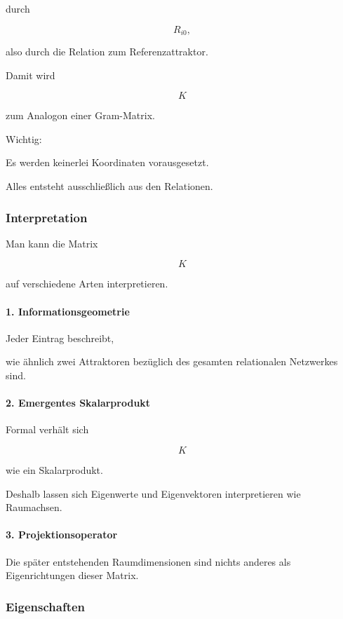 durch

\[
R_{i0},
\]

also durch die Relation zum Referenzattraktor.

Damit wird

\[
K
\]

zum Analogon einer Gram-Matrix.

Wichtig:

Es werden keinerlei Koordinaten vorausgesetzt.

Alles entsteht ausschließlich aus den Relationen.


\subsubsection*{Interpretation}

Man kann die Matrix

\[
K
\]

auf verschiedene Arten interpretieren.

\paragraph{1. Informationsgeometrie}

Jeder Eintrag beschreibt,

wie ähnlich zwei Attraktoren bezüglich des gesamten relationalen Netzwerkes sind.

\paragraph{2. Emergentes Skalarprodukt}

Formal verhält sich

\[
K
\]

wie ein Skalarprodukt.

Deshalb lassen sich Eigenwerte und Eigenvektoren interpretieren wie Raumachsen.

\paragraph{3. Projektionsoperator}

Die später entstehenden Raumdimensionen sind nichts anderes als Eigenrichtungen dieser Matrix.


\subsubsection*{Eigenschaften}

